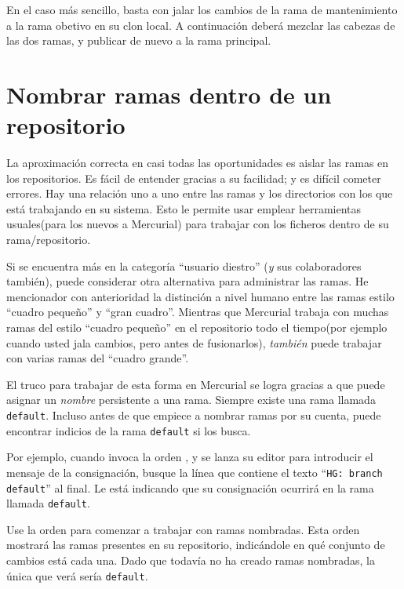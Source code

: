 En el caso más sencillo, basta con jalar los cambios de la rama de
mantenimiento a la rama obetivo en su clon local.
A continuación deberá mezclar las cabezas de las dos ramas, y publicar
de nuevo a la rama principal.

\section{Nombrar ramas dentro de un repositorio}

La aproximación correcta en casi todas las oportunidades es aislar las
ramas en los repositorios.  Es fácil de entender gracias a su
facilidad; y es difícil cometer errores. Hay una relación uno a uno
entre las ramas y los directorios con los que está trabajando en su
sistema. Esto le permite usar emplear herramientas usuales(para los
nuevos a Mercurial) para trabajar con los ficheros dentro de su
rama/repositorio.

Si se encuentra más en la categoría ``usuario diestro'' (\emph{y} sus
colaboradores también), puede considerar otra alternativa para
administrar las ramas. He mencionador con anterioridad la distinción a
nivel humano entre las ramas estilo ``cuadro pequeño'' y ``gran
cuadro''.  Mientras que Mercurial trabaja con muchas ramas del estilo
``cuadro pequeño'' en el repositorio todo el tiempo(por ejemplo cuando
usted jala cambios, pero antes de fusionarlos), \emph{también} puede
trabajar con varias ramas del ``cuadro grande''.

El truco para trabajar de esta forma en Mercurial se logra gracias a
que puede asignar un \emph{nombre} persistente a una rama.  Siempre
existe una rama llamada \texttt{default}.  Incluso antes de que
empiece a nombrar ramas por su cuenta, puede encontrar indicios de la
rama \texttt{default} si los busca.

Por ejemplo, cuando invoca la orden , y se lanza su
editor para introducir el mensaje de la consignación, busque la línea
que contiene el texto ``\texttt{HG: branch default}'' al final. Le
está indicando que su consignación ocurrirá en la rama llamada 
\texttt{default}.

Use la orden  para comenzar a trabajar con ramas
nombradas. Esta orden mostrará las ramas presentes en su repositorio,
indicándole en qué conjunto de cambios está cada una.
Dado que todavía no ha creado ramas nombradas, la única que verá sería
\texttt{default}.

